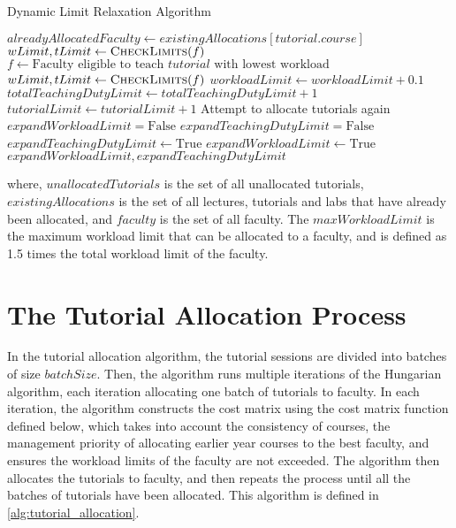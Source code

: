 \begin{algorithm}[H]
  \caption*{Dynamic Limit Relaxation Algorithm}
  \begin{algorithmic}
    \State $alreadyAllocatedFaculty \gets existingAllocations[tutorial.course]$
    \State $wLimit, tLimit \gets \Call{CheckLimits}{f}$
    \EndFor
    \Else
    \State $f \gets \text{Faculty eligible to teach $tutorial$ with lowest workload}$
    \State $wLimit, tLimit \gets \Call{CheckLimits}{f}$
    \EndIf
    \EndFor
    \State $workloadLimit \gets workloadLimit + 0.1$
    \EndIf
    \State $totalTeachingDutyLimit \gets totalTeachingDutyLimit + 1$
    \State $tutorialLimit \gets tutorialLimit + 1$
    \EndIf
    \State Attempt to allocate tutorials again
    \EndWhile
    \EndProcedure
    \\
    \State $expandWorkloadLimit = \text{False}$
    \State $expandTeachingDutyLimit = \text{False}$
    \State $expandTeachingDutyLimit \gets \text{True}$
    \EndIf
    \State $expandWorkloadLimit \gets \text{True}$
    \EndIf
    \State \Return $expandWorkloadLimit, expandTeachingDutyLimit$
    \EndProcedure
  \end{algorithmic}
\end{algorithm}

where, $unallocatedTutorials$ is the set of all unallocated tutorials, $existingAllocations$ is the set of all lectures, tutorials and labs that have already been allocated, and $faculty$ is the set of all faculty. The $maxWorkloadLimit$ is the maximum workload limit that can be allocated to a faculty, and is defined as 1.5 times the total workload limit of the faculty.

\section{The Tutorial Allocation Process}

In the tutorial allocation algorithm, the tutorial sessions are divided into batches of size $batchSize$. Then, the algorithm runs multiple iterations of the Hungarian algorithm, each iteration allocating one batch of tutorials to faculty. In each iteration, the algorithm constructs the cost matrix using the cost matrix function defined below, which takes into account the consistency of courses, the management priority of allocating earlier year courses to the best faculty, and ensures the workload limits of the faculty are not exceeded. The algorithm then allocates the tutorials to faculty, and then repeats the process until all the batches of tutorials have been allocated. This algorithm is defined in \autoref{alg:tutorial_allocation}.

